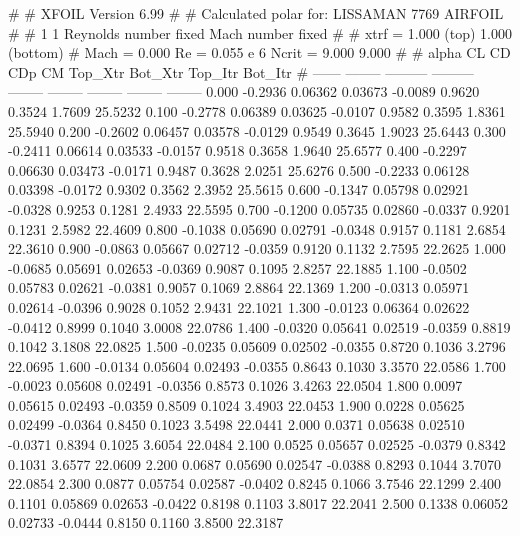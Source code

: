 #  
#       XFOIL         Version 6.99
#  
# Calculated polar for: LISSAMAN 7769 AIRFOIL                           
#  
# 1 1 Reynolds number fixed          Mach number fixed         
#  
# xtrf =   1.000 (top)        1.000 (bottom)  
# Mach =   0.000     Re =     0.055 e 6     Ncrit =   9.000  9.000
#  
#   alpha    CL        CD       CDp       CM     Top_Xtr  Bot_Xtr  Top_Itr  Bot_Itr
#  ------ -------- --------- --------- -------- -------- -------- -------- --------
   0.000  -0.2936   0.06362   0.03673  -0.0089   0.9620   0.3524   1.7609  25.5232
   0.100  -0.2778   0.06389   0.03625  -0.0107   0.9582   0.3595   1.8361  25.5940
   0.200  -0.2602   0.06457   0.03578  -0.0129   0.9549   0.3645   1.9023  25.6443
   0.300  -0.2411   0.06614   0.03533  -0.0157   0.9518   0.3658   1.9640  25.6577
   0.400  -0.2297   0.06630   0.03473  -0.0171   0.9487   0.3628   2.0251  25.6276
   0.500  -0.2233   0.06128   0.03398  -0.0172   0.9302   0.3562   2.3952  25.5615
   0.600  -0.1347   0.05798   0.02921  -0.0328   0.9253   0.1281   2.4933  22.5595
   0.700  -0.1200   0.05735   0.02860  -0.0337   0.9201   0.1231   2.5982  22.4609
   0.800  -0.1038   0.05690   0.02791  -0.0348   0.9157   0.1181   2.6854  22.3610
   0.900  -0.0863   0.05667   0.02712  -0.0359   0.9120   0.1132   2.7595  22.2625
   1.000  -0.0685   0.05691   0.02653  -0.0369   0.9087   0.1095   2.8257  22.1885
   1.100  -0.0502   0.05783   0.02621  -0.0381   0.9057   0.1069   2.8864  22.1369
   1.200  -0.0313   0.05971   0.02614  -0.0396   0.9028   0.1052   2.9431  22.1021
   1.300  -0.0123   0.06364   0.02622  -0.0412   0.8999   0.1040   3.0008  22.0786
   1.400  -0.0320   0.05641   0.02519  -0.0359   0.8819   0.1042   3.1808  22.0825
   1.500  -0.0235   0.05609   0.02502  -0.0355   0.8720   0.1036   3.2796  22.0695
   1.600  -0.0134   0.05604   0.02493  -0.0355   0.8643   0.1030   3.3570  22.0586
   1.700  -0.0023   0.05608   0.02491  -0.0356   0.8573   0.1026   3.4263  22.0504
   1.800   0.0097   0.05615   0.02493  -0.0359   0.8509   0.1024   3.4903  22.0453
   1.900   0.0228   0.05625   0.02499  -0.0364   0.8450   0.1023   3.5498  22.0441
   2.000   0.0371   0.05638   0.02510  -0.0371   0.8394   0.1025   3.6054  22.0484
   2.100   0.0525   0.05657   0.02525  -0.0379   0.8342   0.1031   3.6577  22.0609
   2.200   0.0687   0.05690   0.02547  -0.0388   0.8293   0.1044   3.7070  22.0854
   2.300   0.0877   0.05754   0.02587  -0.0402   0.8245   0.1066   3.7546  22.1299
   2.400   0.1101   0.05869   0.02653  -0.0422   0.8198   0.1103   3.8017  22.2041
   2.500   0.1338   0.06052   0.02733  -0.0444   0.8150   0.1160   3.8500  22.3187
